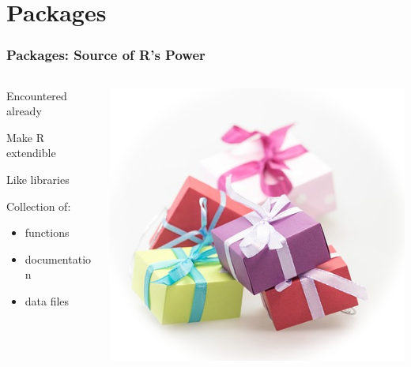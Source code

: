\documentclass{beamer}\usepackage[]{graphicx}\usepackage[]{color}
\begin{document}
\section{Packages}

\begin{frame}
\frametitle{Packages: Source of R's Power}

\begin{columns}[c]
	\begin{column}{.5\textwidth}
		Encountered already \vspace{1em}

		Make R extendible \vspace{1em}

		Like libraries \vspace{1em}

		Collection of:
		\begin{itemize}
			\item functions
			\item documentation
			\item data files
		\end{itemize}

	\end{column}
	\begin{column}{.5\textwidth}
		\includegraphics[width=\textwidth]{figures/packages.png}
	\end{column}
\end{columns}

\end{frame}
\end{document}
